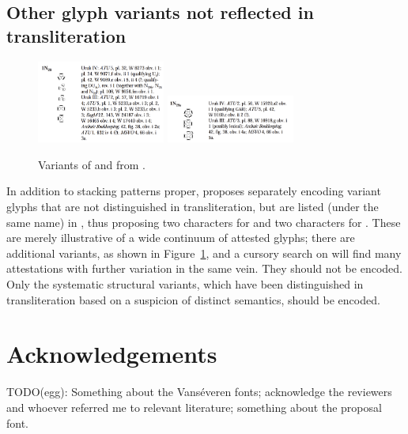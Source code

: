 \documentclass[10pt, a4paper, twoside]{article}
\newcommand\oneNTwentySix{{\proposalfont\symbol{"125AB}}}
\newcommand\oneNTwentyNineA{{\proposalfont\symbol{"125AD}}}
\begin{document}
\subsection{Other glyph variants not reflected in transliteration}
\begin{figure}
  \includegraphics[width=0.375\textwidth]{englund-1(N26).png}
  \includegraphics[width=0.375\textwidth]{englund-1(N29a).png}
  \caption{Variants of \oneNTwentySix{} and \oneNTwentyNineA{} from \cite[31]{Englund2001}.}\label{N26-N29a-variants}
\end{figure}
In addition to stacking patterns proper, \cite[128\psq]{L2/23-190} proposes separately
encoding variant glyphs that are not distinguished in transliteration, but are listed (under the same name) in \cite{archsigns},
thus proposing two characters for \oneNTwentySix{} and two characters for \oneNTwentyNineA{}.
These are merely illustrative of a wide continuum of attested glyphs;
there are additional variants, as shown in Figure~\ref{N26-N29a-variants},
and a cursory search on \cite{CDLI} will find many attestations with further variation in the same vein.
They should not be encoded.
Only the systematic structural variants, which have been distinguished in transliteration
based on a suspicion of distinct semantics, should be encoded.

\section*{Acknowledgements}
TODO(egg): Something about the Vanséveren fonts; acknowledge the reviewers and whoever referred me to relevant literature;
something about the proposal font.
\nocite{DCCLT}
\printbibheading[heading=bibintoc]
\printbibliography[heading=subbibintoc,title={Artefacts},type=artwork]
\printbibliography[heading=subbibintoc,title={ISO and Unicode documents},nottype=artwork,keyword=unicode]
\printbibliography[heading=subbibintoc,title={Online corpora and related projects},nottype=artwork,keyword=reference]
\printbibliography[heading=subbibintoc,title={Other documents},nottype=artwork,notkeyword=unicode,notkeyword=reference]

\end{document}
